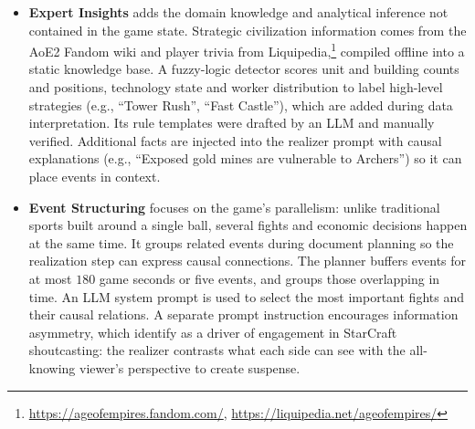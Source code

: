 \documentclass[11pt]{article}
\begin{document}
\begin{itemize}[noitemsep,topsep=2pt,leftmargin=*]
  \item \textbf{Expert Insights} adds the domain knowledge and analytical inference not contained in the game state. Strategic civilization information comes from the AoE2 Fandom wiki and player trivia from Liquipedia,\footnote{\url{https://ageofempires.fandom.com/}, \url{https://liquipedia.net/ageofempires/}} compiled offline into a static knowledge base. A fuzzy-logic detector scores unit and building counts and positions, technology state and worker distribution to label high-level strategies (e.g., ``Tower Rush'', ``Fast Castle''), which are added during data interpretation. Its rule templates were drafted by an LLM and manually verified. Additional facts are injected into the realizer prompt with causal explanations (e.g., ``Exposed gold mines are vulnerable to Archers'') so it can place events in context.
  \item \textbf{Event Structuring} focuses on the game's parallelism: unlike traditional sports built around a single ball, several fights and economic decisions happen at the same time. It groups related events during document planning so the realization step can express causal connections. The planner buffers events for at most $180$ game seconds or five events, and groups those overlapping in time. An LLM system prompt is used to select the most important fights and their causal relations. A separate prompt instruction encourages information asymmetry, which \citet{cheung2011starcraft} identify as a driver of engagement in StarCraft shoutcasting: the realizer contrasts what each side can see with the all-knowing viewer's perspective to create suspense.
\end{itemize}
\end{document}

